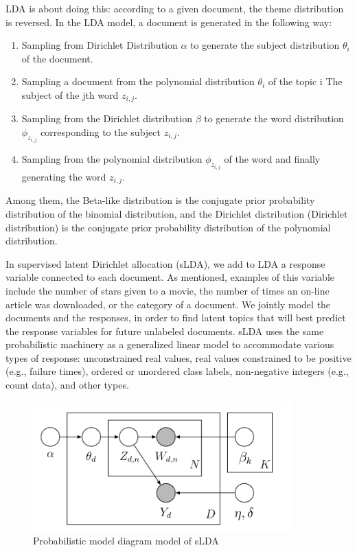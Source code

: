 \documentclass{acmtog} %
\begin{document}
LDA is about doing this: according to a given document, the theme distribution is reversed.
In the LDA model, a document is generated in the following way:
\begin{enumerate}
    \item Sampling from Dirichlet Distribution $\alpha$ to generate the subject distribution $\theta _ { i }$  of the document.
    
    \item Sampling a document from the polynomial distribution $\theta _ { i }$ of the topic i The subject of the jth word $z _ { i , j }$.
    
    \item Sampling from the Dirichlet distribution $\beta$ to generate the word distribution $\phi _ { z _ { i , j } }$  corresponding to the subject $z _ { i , j }$.
    
    \item Sampling from the polynomial distribution $\phi _ { z _ { i , j } }$ of the word and finally generating the word $z _ { i , j }$.
\end{enumerate}

Among them, the Beta-like distribution is the conjugate prior probability distribution of the binomial distribution, and the Dirichlet distribution (Dirichlet distribution) is the conjugate prior probability distribution of the polynomial distribution.

In supervised latent Dirichlet allocation (sLDA), we add to LDA a response variable connected to each document. As mentioned, examples of this variable include the number of stars given to a movie, the number of times an on-line article was downloaded, or the category of a document. We jointly model the documents and the responses, in order to find latent topics that will best predict the response variables for future unlabeled documents. sLDA uses the same probabilistic machinery as a generalized linear model to accommodate various types of response: unconstrained real values, real values constrained to be positive (e.g., failure times), ordered or unordered class labels, non-negative integers (e.g., count data), and other types.

\begin{figure}[h]
\centerline{\includegraphics[width=10cm]{Figure 5.png}}
\caption{Probabilistic model diagram model of sLDA}
  \label{fig:videocomparison}
\end{figure}
\end{document}

